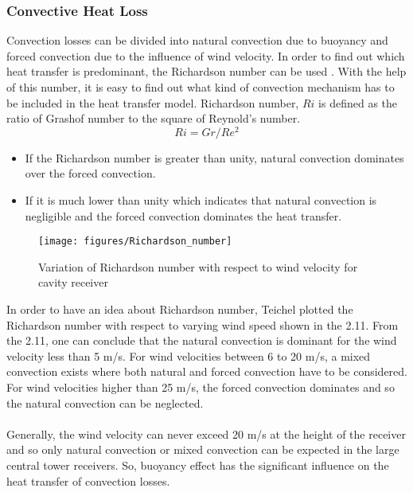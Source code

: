 \subsubsection{Convective Heat Loss}
Convection losses can be divided into natural convection due to buoyancy and forced convection due to the influence of wind velocity.  In order to find out which heat transfer is predominant, the Richardson number can be used \cite{Teichel.2011}. With the help of this number, it is easy to find out what kind of convection mechanism has to be included in the heat transfer model. Richardson number, $Ri$ is defined as the ratio of Grashof number to the square of Reynold’s number.
\begin{equation}
Ri = Gr/Re^2
\end{equation}
\begin{itemize}
	\item If the Richardson number is greater than unity, natural convection dominates over the forced convection. 
	\item If it is much lower than unity which indicates that natural convection is negligible and the forced convection dominates the heat transfer.
\end{itemize}
\begin{figure}[h]
	\texttt{[image: figures/Richardson\_number]}
	\centering
	\caption{Variation of Richardson number with respect to wind velocity for cavity receiver \cite{Teichel.2011} }
\end{figure}
In order to have an idea about Richardson number, Teichel \cite{Teichel.2011} plotted the Richardson number with respect to varying wind speed shown in the \figurename{ 2.11}. From the \figurename{ 2.11}, one can conclude that the natural convection is dominant for the wind velocity less than 5 m/s. For wind velocities between 6 to 20 m/s, a mixed convection exists where both natural and forced convection have to be considered. For wind velocities higher than 25 m/s, the forced convection dominates and so the natural convection can be neglected. \\\\
Generally, the wind velocity can never exceed 20 m/s at the height of the receiver \cite{Teichel.2011} and so only natural convection or mixed convection can be expected in the large central tower receivers. So, buoyancy effect has the significant influence on the heat transfer of convection losses.\\\\
